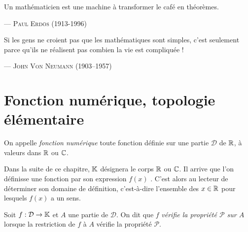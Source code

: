 \documentclass{magnolia}
\begin{document}
\setlength{}
\epigraph{\og Un mathématicien est une machine à transformer le café en théorèmes.\fg}{--- \textsc{Paul Erdös (1913-1996)}}
\setlength{}
\epigraph{\og Si les gens ne croient pas que les mathématiques sont simples, c’est seulement parce qu’ils ne réalisent pas combien la vie est compliquée !\fg}{--- \textsc{John Von Neumann (1903--1957)}}

\magtoc

\section{Fonction numérique, topologie élémentaire}

\begin{definition}[utile=-3]
On appelle \emph{fonction numérique} toute fonction définie sur une partie $\mathcal{D}$
de $\mathbb{R}$, à valeurs dans $\mathbb{R}$ ou $\mathbb{C}$.
\end{definition}

\begin{remarques}
\remarque Dans la suite de ce chapitre, $\mathbb{K}$ désignera le corps $\mathbb{R}$ ou $\mathbb{C}$.
\remarque Il arrive que l'on définisse une fonction par son expression \og $f(x)$ \fg. C'est
  alors au lecteur de déterminer son domaine de définition, c'est-à-dire l'ensemble des
  $x\in\mathbb{R}$ pour lesquels \og $f(x)$ \fg a un sens.
\end{remarques}

\begin{definition}[utile=-3]
Soit $f:\mathcal{D}\to\mathbb{K}$ et $A$ une partie de $\mathcal{D}$. On dit que $f$
\emph{vérifie la propriété $\mathcal{P}$ sur $A$} lorsque la restriction de $f$ à $A$ vérifie
la propriété $\mathcal{P}$.
\end{definition}


\end{document}

